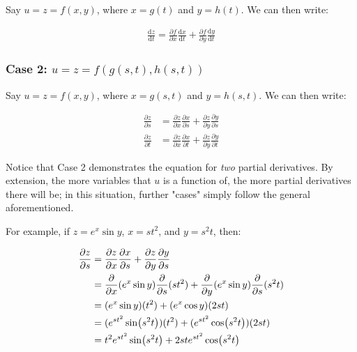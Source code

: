 \documentclass[12pt]{article}
\begin{document}
Say $u = z = f(x,y)$, where $x = g(t)$ and $y = h(t)$. We can then write:

\begin{equation}
    \begin{split}
        \frac{\text{d}z}{\text{d}t} = \frac{\partial f}{\partial x} \frac{\text{d}x}{\text{d}t} + \frac{\partial f}{\partial y}\frac{\text{d}y}{\text{d}t}
    \end{split}
\end{equation}

\subsubsection*{\texorpdfstring{Case 2: $u=z=f(g(s,t),h(s,t))$}{A function of two parametrically defined functions in terms of two variables}}

Say $u = z = f(x,y)$, where $x = g(s,t)$ and $y = h(s,t)$. We can then write:

\begin{equation}
    \begin{split}
        \frac{\partial z}{\partial s}&=\frac{\partial z}{\partial x} \frac{\partial x}{\partial s}+\frac{\partial z}{\partial y} \frac{\partial y}{\partial s}\\
        \frac{\partial z}{\partial t}&=\frac{\partial z}{\partial x} \frac{\partial x}{\partial t}+\frac{\partial z}{\partial y} \frac{\partial y}{\partial t}
    \end{split}
\end{equation}

Notice that Case 2 demonstrates the equation for \textit{two} partial derivatives. By extension, the more variables that $u$ is a function of, the more partial derivatives there will be; in this situation, further "cases" simply follow the general aforementioned. 

For example, if $z = e^x \sin y$, $x = st^2$, and $y = s^2t$, then:

\begin{equation}
    \begin{split}
        \frac{\partial z}{\partial s} &= \frac{\partial z}{\partial x} \frac{\partial x}{\partial s} + \frac{\partial z}{\partial y} \frac{\partial y}{\partial s}\\
        &= \frac{\partial }{\partial x}(e^x \sin y) \frac{\partial }{\partial s}(st^2) + \frac{\partial }{\partial y}(e^x \sin y) \frac{\partial }{\partial s}(s^2t)\\
        &= (e^x \sin y)(t^2) + (e^x \cos y)(2st)\\
        &= (e^{st^2} \sin(s^2t))(t^2) + (e^{st^2} \cos(s^2t))(2st)\\
        &= t^2 e^{s t^2} \sin(s^2 t)+2 s t e^{s t^2} \cos(s^2 t)
    \end{split}
\end{equation}
\end{document}
